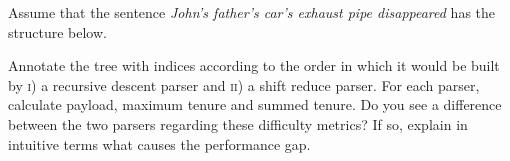 \begin{exercise}
    Assume that the sentence \emph{John's father's car's exhaust pipe disappeared} has the structure below.
    \begin{center}
    \end{center}
    Annotate the tree with indices according to the order in which it would be built by \textsc{i}) a recursive descent parser and \textsc{ii}) a shift reduce parser.
    For each parser, calculate payload, maximum tenure and summed tenure.
    Do you see a difference between the two parsers regarding these difficulty metrics?
    If so, explain in intuitive terms what causes the performance gap. 
    \label{ex:BottomUp_LeftEmbedding}
\end{exercise}

